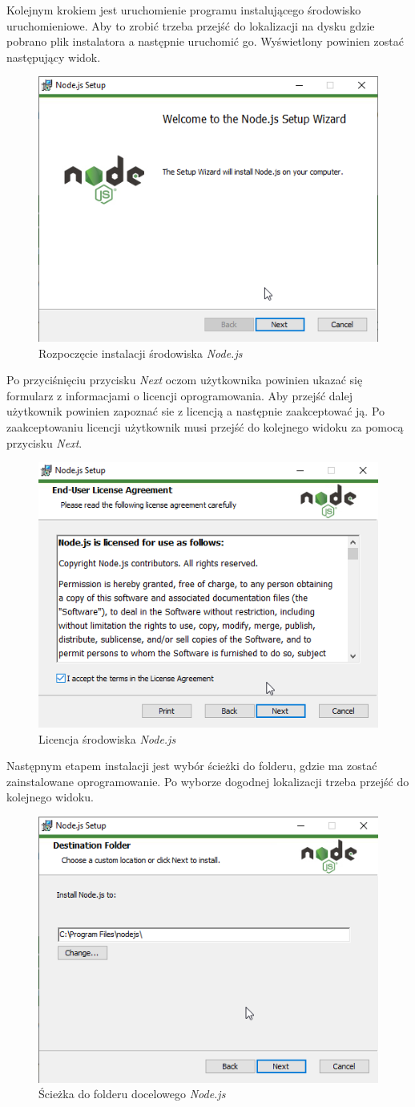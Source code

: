 \documentclass[a4paper,twoside,12pt]{book}
\begin{document}
Kolejnym krokiem jest uruchomienie programu instalującego środowisko uruchomieniowe. Aby to zrobić trzeba przejść do lokalizacji na dysku gdzie pobrano plik instalatora a następnie uruchomić go. Wyświetlony powinien zostać następujący widok.
\begin{figure}[H]
	\centering
	\includegraphics[width=0.5\linewidth]{../zrzuty_ekranu/instalacja_nodejs/node1}
	\caption{Rozpoczęcie instalacji środowiska \textit{Node.js}}
	\label{fig:node1}
\end{figure}

Po przyciśnięciu przycisku \textit{Next} oczom użytkownika powinien ukazać się formularz z informacjami o licencji oprogramowania. Aby przejść dalej użytkownik powinien zapoznać sie z licencją a następnie zaakceptować ją. Po zaakceptowaniu licencji użytkownik musi przejść do kolejnego widoku za pomocą przycisku \textit{Next}.
\begin{figure}[H]
	\centering
	\includegraphics[width=0.5\linewidth]{../zrzuty_ekranu/instalacja_nodejs/node2}
	\caption{Licencja środowiska \textit{Node.js}}
	\label{fig:node2}
\end{figure}

Następnym etapem instalacji jest wybór ścieżki do folderu, gdzie ma zostać zainstalowane oprogramowanie. Po wyborze dogodnej lokalizacji trzeba przejść do kolejnego widoku.
\begin{figure}[H]
	\centering
	\includegraphics[width=0.5\linewidth]{../zrzuty_ekranu/instalacja_nodejs/node3}
	\caption{Ścieżka do folderu docelowego \textit{Node.js}}
	\label{fig:node3}
\end{figure}
\end{document}
